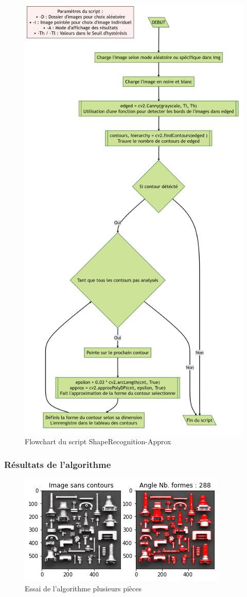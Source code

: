 	\begin{figure}[h!]
		\centering
		\includegraphics[width=0.65\linewidth]{../Flowcharts/output}
		\caption{Flowchart du script ShapeRecognition-Approx}
		\label{fig:FlowShapeRecog}
	\end{figure}
	
	\clearpage
	
	
	\subsubsection{Résultats de l'algorithme}
	
	\begin{figure}[h]
		\centering
		\includegraphics[width=0.8\linewidth]{Figures/ShapeRecogn_Exemple1}
		\caption{Essai de l'algorithme plusieurs pièces}
		\label{fig:shaperecognexemple1}
	\end{figure}
	
